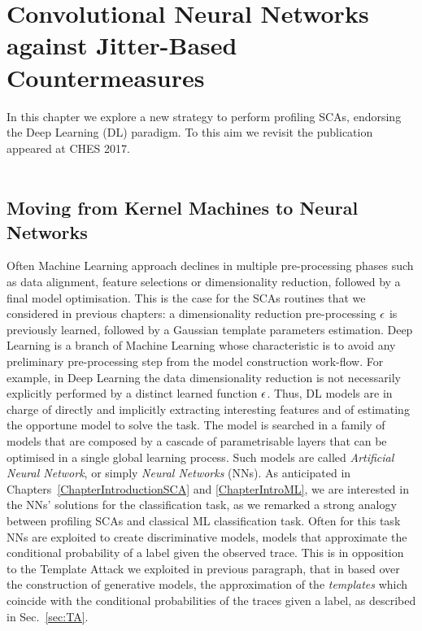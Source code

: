 
\chapter{Convolutional Neural Networks against Jitter-Based Countermeasures} %

\label{ChapterCNN}

In this chapter we explore a new strategy to perform profiling SCAs, endorsing the Deep Learning (DL) paradigm. To this aim we revisit the publication \cite{cagli2017defeating} appeared at CHES 2017.\\
\\


\section{Moving from Kernel Machines to Neural Networks}

Often Machine Learning approach declines in multiple pre-processing phases such as data alignment, feature selections or dimensionality reduction, followed by a final model optimisation. This is the case for the SCAs routines that we considered in previous chapters: a dimensionality reduction pre-processing $\epsilon$ is previously learned, followed by a Gaussian template parameters estimation.  Deep Learning is a
branch of Machine Learning whose characteristic is to avoid any preliminary pre-processing step from the model construction work-flow. For example, in Deep
Learning the data dimensionality reduction is not necessarily explicitly performed by a distinct learned  function $\epsilon$. Thus, DL models are in charge
of directly and implicitly extracting interesting features and of estimating the
opportune model to solve the task. The model is searched in a family of models that are composed by a cascade of parametrisable layers that can be optimised in a single global learning process. Such models are called \emph{Artificial Neural Network}, or simply \emph{Neural Networks} (NNs). As anticipated in Chapters~\ref{ChapterIntroductionSCA} and \ref{ChapterIntroML}, we are interested in the NNs' solutions for the classification task, as we remarked a strong analogy between profiling SCAs and classical ML classification task. Often for this task NNs are exploited to create discriminative models, \ie models that approximate the conditional probability of a label given the observed trace. This is in opposition to the Template Attack we exploited in previous paragraph, that in based over the construction of generative models, \ie the approximation of the \emph{templates} which coincide with the conditional probabilities of the traces given a label, as described in Sec.~\ref{sec:TA}.\\

